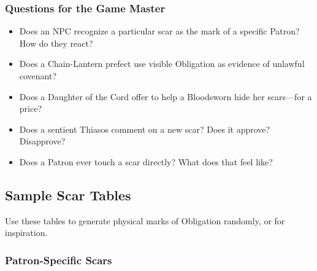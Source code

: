 \subsubsection{Questions for the Game Master}

\begin{itemize}
\item Does an NPC recognize a particular scar as the mark of a specific Patron? How do they react?
\item Does a Chain-Lantern prefect use visible Obligation as evidence of unlawful covenant?
\item Does a Daughter of the Cord offer to help a Bloodsworn hide her scars—for a price?
\item Does a sentient Thiasos comment on a new scar? Does it approve? Disapprove?
\item Does a Patron ever touch a scar directly? What does that feel like?
\end{itemize}

\subsection{Sample Scar Tables}

Use these tables to generate physical marks of Obligation randomly, or for inspiration.

\subsubsection{Patron-Specific Scars}

